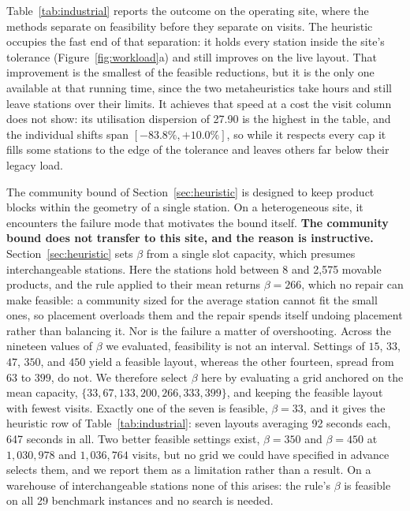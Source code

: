 \documentclass[]{interact}
\begin{document}
Table~\ref{tab:industrial} reports the outcome on the operating site, where the methods separate on feasibility before they separate on visits. The heuristic occupies the fast end of that separation: it holds every station inside the site's tolerance (Figure~\ref{fig:workload}a) and still improves on the live layout. That improvement is the smallest of the feasible reductions, but it is the only one available at that running time, since the two metaheuristics take hours and still leave stations over their limits. It achieves that speed at a cost the visit column does not show: its utilisation dispersion of 27.90 is the highest in the table, and the individual shifts span $[-83.8\%, +10.0\%]$, so while it respects every cap it fills some stations to the edge of the tolerance and leaves others far below their legacy load.

The community bound of Section~\ref{sec:heuristic} is designed to keep product blocks within the geometry of a single station. On a heterogeneous site, it encounters the failure mode that motivates the bound itself. \textbf{The community bound does not transfer to this site, and the reason is instructive.} Section~\ref{sec:heuristic} sets $\beta$ from a single slot capacity, which presumes interchangeable stations. Here the stations hold between 8 and 2{,}575 movable products, and the rule applied to their mean returns $\beta=266$, which no repair can make feasible: a community sized for the average station cannot fit the small ones, so placement overloads them and the repair spends itself undoing placement rather than balancing it. Nor is the failure a matter of overshooting. Across the nineteen values of $\beta$ we evaluated, feasibility is not an interval. Settings of $15$, $33$, $47$, $350$, and $450$ yield a feasible layout, whereas the other fourteen, spread from $63$ to $399$, do not. We therefore select $\beta$ here by evaluating a grid anchored on the mean capacity, $\{33,67,133,200,266,333,399\}$, and keeping the feasible layout with fewest visits. Exactly one of the seven is feasible, $\beta=33$, and it gives the heuristic row of Table~\ref{tab:industrial}: seven layouts averaging 92 seconds each, 647 seconds in all. Two better feasible settings exist, $\beta=350$ and $\beta=450$ at $1{,}030{,}978$ and $1{,}036{,}764$ visits, but no grid we could have specified in advance selects them, and we report them as a limitation rather than a result. On a warehouse of interchangeable stations none of this arises: the rule's $\beta$ is feasible on all 29 benchmark instances and no search is needed.
\end{document}
